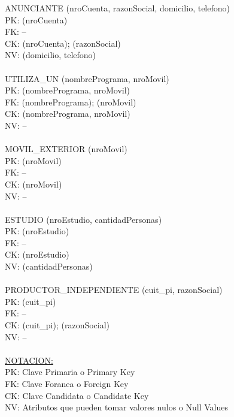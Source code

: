 \documentclass[a4paper,10pt,titlepage]{article}
\begin{document}
ANUNCIANTE (nroCuenta, razonSocial, domicilio, telefono)\\
PK: (nroCuenta)\\
FK: --\\
CK: (nroCuenta); (razonSocial)\\
NV: (domicilio, telefono)\\
\\
UTILIZA\_UN (nombrePrograma, nroMovil)\\
PK: (nombrePrograma, nroMovil)\\
FK: (nombrePrograma); (nroMovil)\\
CK: (nombrePrograma, nroMovil)\\
NV: --\\
\\
MOVIL\_EXTERIOR (nroMovil)\\
PK: (nroMovil)\\
FK: --\\
CK: (nroMovil)\\
NV: --\\
\\
ESTUDIO (nroEstudio, cantidadPersonas)\\
PK: (nroEstudio)\\
FK: --\\
CK: (nroEstudio)\\
NV: (cantidadPersonas)\\
\\
PRODUCTOR\_INDEPENDIENTE (cuit\_pi, razonSocial)\\
PK: (cuit\_pi)\\
FK: --\\
CK: (cuit\_pi); (razonSocial)\\
NV: --\\
\\
\underline{NOTACION:}\\
PK: Clave Primaria o Primary Key\\
FK: Clave Foranea o Foreign Key\\
CK: Clave Candidata o Candidate Key\\
NV: Atributos que pueden tomar valores nulos o Null Values\\
\\

\pagebreak
\end{document}
